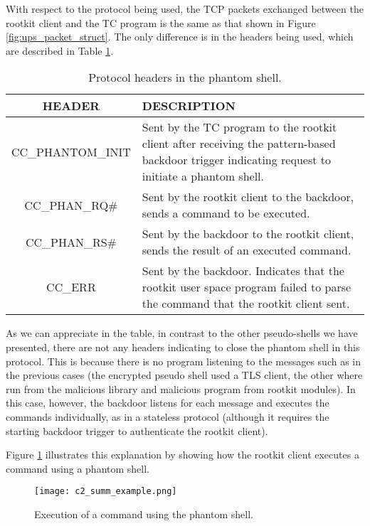 With respect to the protocol being used, the TCP packets exchanged between the rootkit client and the TC program is the same as that shown in Figure \ref{fig:ups_packet_struct}. The only difference is in the headers being used, which are described in Table \ref{table:phantom_headers}.

\begin{table}[htbp]
\begin{tabular}{|c|>{\centering\arraybackslash}p{8cm}|}
\hline
\textbf{HEADER} & \textbf{DESCRIPTION}\\
\hline
\hline
CC\_PHANTOM\_INIT & Sent by the TC program to the rootkit client after receiving the pattern-based backdoor trigger indicating request to initiate a phantom shell.\\
\hline
CC\_PHAN\_RQ\# & Sent by the rootkit client to the backdoor, sends a command to be executed.\\
\hline
CC\_PHAN\_RS\# & Sent by the backdoor to the rootkit client, sends the result of an executed command.\\
\hline
CC\_ERR & Sent by the backdoor. Indicates that the rootkit user space program failed to parse the command that the rootkit client sent.\\
\hline
\end{tabular}
\caption{Protocol headers in the phantom shell.}
\label{table:phantom_headers}
\end{table}

As we can appreciate in the table, in contrast to the other pseudo-shells we have presented, there are not any headers indicating to close the phantom shell in this protocol. This is because there is no program listening to the messages such as in the previous cases (the encrypted pseudo shell used a TLS client, the other where run from the malicious library and malicious program from rootkit modules). In this case, however, the backdoor listens for each message and executes the commands individually, as in a stateless protocol (although it requires the starting backdoor trigger to authenticate the rootkit client).

Figure \ref{fig:c2_summ_example} illustrates this explanation by showing how the rootkit client executes a command using a phantom shell.

\begin{figure}[htbp]
	\centering
	\texttt{[image: c2\_summ\_example.png]}
	\caption{Execution of a command using the phantom shell.}
	\label{fig:c2_summ_example}
\end{figure}

